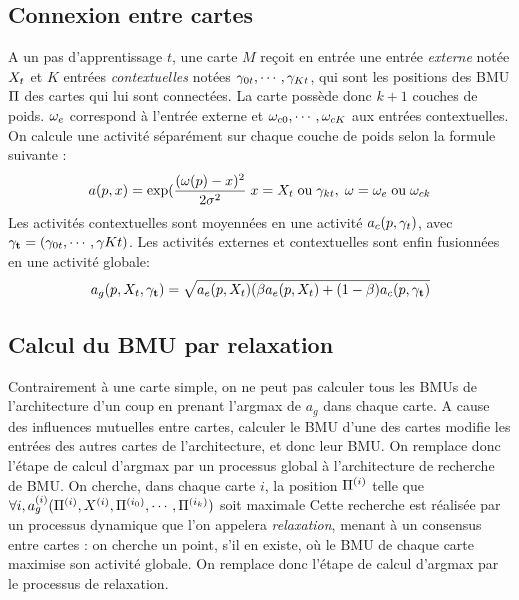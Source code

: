 \subsection{Connexion entre cartes}
A un pas d'apprentissage $t$, une carte $M$ reçoit en entrée une entrée \emph{externe} notée $X_t$ et $K$ entrées \emph{contextuelles} notées $\gamma_{0t},\cdots,\gamma_{Kt}$, qui sont les positions des BMU $\Pi$ des cartes qui lui sont connectées. La carte possède donc $k+1$ couches de poids. $\omega_e$ correspond à l'entrée externe et $\omega_{c0}, \cdots, \omega_{cK}$ aux entrées contextuelles. On calcule une activité séparément sur chaque couche de poids selon la formule suivante : 
\begin{equation}
\label{eq:activite}
a(p,x) = \exp(\frac{(\omega(p)-x)^2}{2\sigma^2} \; x = X_t\; \text{ou}\; \gamma_{kt}, \; \omega = \omega_e \;\text{ou}\; \omega_{ck}
\end{equation}
Les activités contextuelles sont moyennées en une activité $a_c(p,\mathbf{\gamma}_t)$, avec $\mathbf{\gamma_t} = (\gamma_{0t}, \cdots, \gamma{Kt})$. 
Les activités externes et contextuelles sont enfin fusionnées en une activité globale:
\begin{equation}
\label{eq:global_act}
a_g(p,X_t,\mathbf{\gamma_t}) = \sqrt{a_e(p,X_t)(\beta a_e(p,X_t) + (1-\beta) a_c(p, \mathbf{\gamma_t})}
\end{equation} 

\subsection{Calcul du BMU par relaxation}

Contrairement à une carte simple, on ne peut pas calculer tous les BMUs de l'architecture d'un coup en prenant l'argmax de $a_g$ dans chaque carte.
A cause des influences mutuelles entre cartes, calculer le BMU d'une des cartes modifie les entrées des autres cartes de l'architecture, et donc leur BMU. On remplace donc l'étape de calcul d'argmax par un processus global à l'architecture de recherche de BMU. On cherche, dans chaque carte $i$, la position $\Pi^{({i})}$ telle que $\forall i, a_g^{({i})}(\Pi^{({i})},X^{({i})},\Pi^{({i_0})},\cdots,\Pi^{({i_k})})$ soit maximale
Cette recherche est réalisée par un processus dynamique que l'on appelera \emph{relaxation}, menant à un consensus entre cartes : on cherche un point, s'il en existe, où le BMU de chaque carte maximise son activité globale. On remplace donc l'étape de calcul d'argmax par le processus de relaxation.

